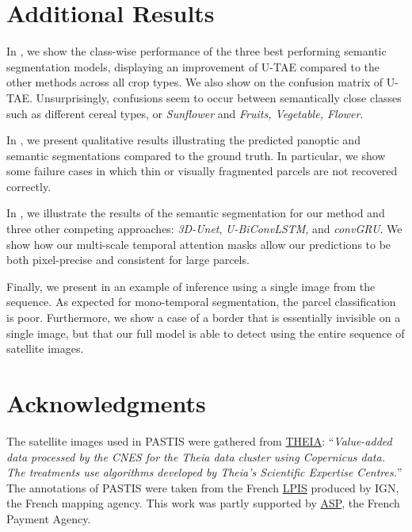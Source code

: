 \section{Additional Results}
{In , we show the class-wise performance of the three best performing semantic segmentation models, displaying an improvement of U-TAE compared to the other methods across all crop types. We also show on  the confusion matrix of U-TAE. Unsurprisingly, confusions seem to occur between semantically close classes such as different cereal types, or \textit{Sunflower} and \textit{Fruits, Vegetable, Flower}.  }

In , we present qualitative results illustrating the predicted panoptic and semantic segmentations compared to the ground truth. In particular, we show some failure cases in which thin or visually fragmented parcels are not recovered correctly.

In , we illustrate the results of the semantic segmentation for our method and three other competing approaches: \emph{3D-Unet}, \emph{U-BiConvLSTM}, and \emph{convGRU}. We show how our multi-scale temporal attention masks allow our predictions to be both pixel-precise and consistent for large parcels.

Finally, we present in  an example of inference using a single image from the sequence. As expected for mono-temporal segmentation, the parcel classification is poor. Furthermore, we show a case of a border that is essentially invisible on a single image, but that our full model is able to detect using the entire sequence of satellite images. 


\section*{Acknowledgments}
The satellite images used in PASTIS were gathered from  \href{www.theia.land.fr}{THEIA}: 
``\emph{Value-added data processed by the CNES for the Theia data cluster using Copernicus data.
The treatments use algorithms developed by Theia’s Scientific Expertise Centres.}''
The annotations of PASTIS were taken from the French \href{https://www.data.gouv.fr/en/datasets/registre-parcellaire-graphique-rpg-contours-des-parcelles-et-ilots-culturaux-et-leur-groupe-de-cultures-majoritaire/}{LPIS} produced
 by IGN, the French mapping agency.
This work was partly supported by \href{https://www.asp-public.fr}{ASP}, the French Payment Agency.


